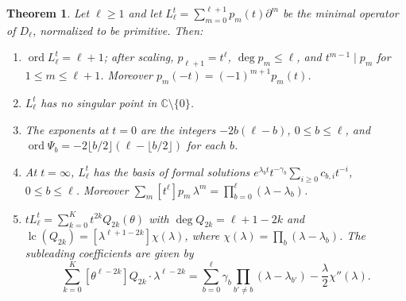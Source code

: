 \documentclass[11pt,a4paper]{article}
\newtheorem{theorem}{Theorem}[section]
\theoremstyle{definition}
\theoremstyle{remark}
\newcommand{\C}{\mathbb C}
\newcommand{\fl}[1]{\lfloor #1\rfloor}
\DeclareMathOperator{\ord}{ord}
\DeclareMathOperator{\lc}{lc}
\numberwithin{equation}{section}
\begin{document}
\begin{theorem}\label{B:thm:Dt}
Let $\ell\ge1$ and let $L^t_\ell=\sum_{m=0}^{\ell+1}p_m(t)\partial^m$ be the minimal operator of $D_\ell$, normalized to be primitive. Then:
\begin{enumerate}
\item[(i)] $\ord L^t_\ell=\ell+1$; after scaling, $p_{\ell+1}=t^\ell$, $\deg p_m\le\ell$, and $t^{m-1}\mid p_m$ for $1\le m\le\ell+1$. Moreover $p_m(-t)=(-1)^{m+1}p_m(t)$.
\item[(ii)] $L^t_\ell$ has no singular point in $\C\setminus\{0\}$.
\item[(iii)] The exponents at $t=0$ are the integers $-2b(\ell-b)$, $0\le b\le\ell$, and $\ord\Psi_b=-2\fl{b/2}(\ell-\fl{b/2})$ for each $b$.
\item[(iv)] At $t=\infty$, $L^t_\ell$ has the basis of formal solutions $e^{\lambda_bt}t^{-\gamma_b}\sum_{i\ge0}c_{b,i}t^{-i}$, $0\le b\le\ell$. Moreover $\sum_m[t^\ell]p_m\,\lambda^m=\prod_{b=0}^{\ell}(\lambda-\lambda_b)$.
\item[(v)] $tL^t_\ell=\sum_{k=0}^{K}t^{2k}Q_{2k}(\theta)$ with $\deg Q_{2k}=\ell+1-2k$ and $\lc(Q_{2k})=[\lambda^{\ell+1-2k}]\chi(\lambda)$, where $\chi(\lambda)=\prod_b(\lambda-\lambda_b)$. The subleading coefficients are given by
\begin{equation}\label{B:eq:eta}
\sum_{k=0}^{K}[\theta^{\ell-2k}]Q_{2k}\cdot\lambda^{\ell-2k}=\sum_{b=0}^{\ell}\gamma_b\prod_{b'\ne b}(\lambda-\lambda_{b'})-\frac{\lambda}{2}\chi''(\lambda).
\end{equation}
\end{enumerate}
\end{theorem}
\end{document}
